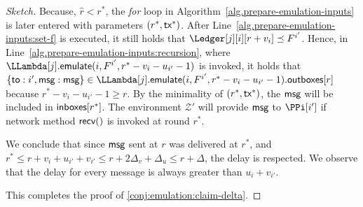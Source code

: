 \begin{proof}[Sketch]
  Because, $\hat{r} < r^*$, the \emph{for} loop in Algorithm~\ref{alg.prepare-emulation-inputs}
  is later entered with parameters $(r^*, \textsf{tx}^*)$.
  After Line~\ref{alg.prepare-emulation-inputs:set-f} is executed,
  it still holds that $\Ledger[j][i][r + v_i] \preceq F^{i'}$.
  Hence, in Line~\ref{alg.prepare-emulation-inputs:recursion}, where
  $\LLambda[j].\emulate(i, F^{i'}, r^* - v_i - u_{i'} - 1)$ is invoked, it holds that
  $\{\textsf{to}: i', \msg: \msg\} \in \LLambda[j].\emulate(i, F^{i'}, r^* - v_i - u_{i'} - 1).\outboxes[r]$
  because $r^* - v_i - u_{i'} - 1 \geq r$.
  By the minimality of $(r^*, \textsf{tx}^*)$, the $\textsf{msg}$ will be included in $\textsf{inboxes}[r^*]$.
  The environment $\mathcal{Z}'$ will provide $\textsf{msg}$ to $\PPi[i']$
  if network method $\textsf{recv}()$ is invoked at round $r^*$.

  We conclude that since $\textsf{msg}$ sent at $r$ was delivered at $r^*$,
  and $r^* \leq r + v_{i} + u_{i'} + v_{i'} \leq r + 2 \Delta_v + \Delta_u \leq r + \Delta$, the
  delay is respected. We observe that the delay for every message is always
  greater than $u_i + v_{i'}$.

  This completes the proof of \ref{conj:emulation:claim-delta}.





\end{proof}
